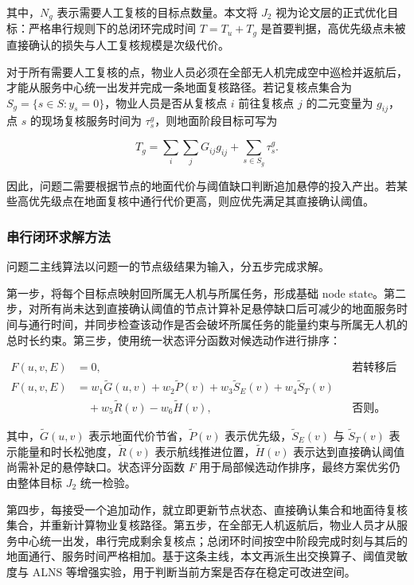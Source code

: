 \documentclass[12pt]{article}
\begin{document}
其中，$N_g$ 表示需要人工复核的目标点数量。本文将 $J_2$ 视为论文层的正式优化目标：严格串行规则下的总闭环完成时间 $T=T_u+T_g$ 是首要判据，高优先级点未被直接确认的损失与人工复核规模是次级代价。

对于所有需要人工复核的点，物业人员必须在全部无人机完成空中巡检并返航后，才能从服务中心统一出发并完成一条地面复核路径。若记复核点集合为 $S_g=\{s \in S : y_s=0\}$，物业人员是否从复核点 $i$ 前往复核点 $j$ 的二元变量为 $g_{ij}$，点 $s$ 的现场复核服务时间为 $\tau_s^g$，则地面阶段目标可写为

\begin{equation}
T_g = \sum_i \sum_j G_{ij} g_{ij} + \sum_{s \in S_g} \tau_s^g.
\end{equation}

因此，问题二需要根据节点的地面代价与阈值缺口判断追加悬停的投入产出。若某些高优先级点在地面复核中通行代价更高，则应优先满足其直接确认阈值。

\subsubsection{串行闭环求解方法}
问题二主线算法以问题一的节点级结果为输入，分五步完成求解。

第一步，将每个目标点映射回所属无人机与所属任务，形成基础 node state。第二步，对所有尚未达到直接确认阈值的节点计算补足悬停缺口后可减少的地面服务时间与通行时间，并同步检查该动作是否会破坏所属任务的能量约束与所属无人机的总时长约束。第三步，使用统一状态评分函数对候选动作进行排序：

\begin{equation}
\begin{aligned}
F(u,v,E) &= 0, && \text{若转移后不可返航；} \\
F(u,v,E) &= w_1 \tilde{G}(u,v)+w_2 \tilde{P}(v)+w_3 \tilde{S}_E(v)
	       + w_4 \tilde{S}_T(v) \\
	      &\quad + w_5 \tilde{R}(v)-w_6 \tilde{H}(v), && \text{否则。}
\end{aligned}
\end{equation}

其中，$\tilde{G}(u,v)$ 表示地面代价节省，$\tilde{P}(v)$ 表示优先级，$\tilde{S}_E(v)$ 与 $\tilde{S}_T(v)$ 表示能量和时长松弛度，$\tilde{R}(v)$ 表示航线推进位置，$\tilde{H}(v)$ 表示达到直接确认阈值尚需补足的悬停缺口。状态评分函数 $F$ 用于局部候选动作排序，最终方案优劣仍由整体目标 $J_2$ 统一检验。

第四步，每接受一个追加动作，就立即更新节点状态、直接确认集合和地面待复核集合，并重新计算物业复核路径。第五步，在全部无人机返航后，物业人员才从服务中心统一出发，串行完成剩余复核点；总闭环时间按空中阶段完成时刻与其后的地面通行、服务时间严格相加。基于这条主线，本文再派生出交换算子、阈值灵敏度与 ALNS 等增强实验，用于判断当前方案是否存在稳定可改进空间。
\end{document}
